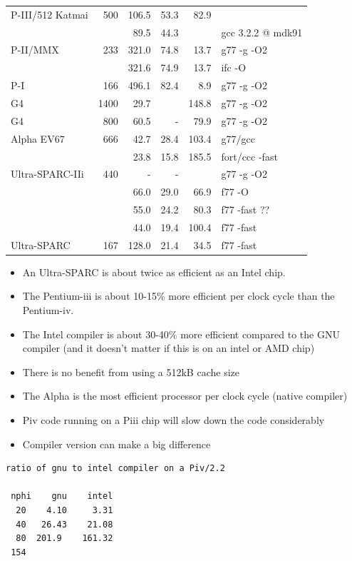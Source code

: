 \documentclass[10pt,dvips]{article}
\begin{document}
\begin{table}[htbp]
\begin{tabular}{|l|r|r|r|r|l|}
P-III/512 Katmai & 500  &	106.5 & 53.3  &  82.9 & \\  %
                &       &        89.5 & 44.3  &       & gcc 3.2.2 @ mdk91 \\
P-II/MMX        & 233   &       321.0 & 74.8  &  13.7 & g77 -g -O2 \\ %
		&	&	321.6 & 74.9  &  13.7 & ifc -O \\
P-I             & 166   &       496.1 & 82.4  &   8.9 & g77 -g -O2 \\ %
\hline
G4              & 1400  &        29.7 &       & 148.8 & g77 -g -O2\\ %
G4              &  800  &        60.5 & -     &  79.9 & g77 -g -O2 \\ %
\hline
Alpha EV67	& 666   &        42.7 & 28.4  & 103.4 & g77/gcc \\ %
		&       &        23.8 & 15.8  & 185.5 & fort/ccc -fast \\
Ultra-SPARC-IIi &  440  &	   -  &   -   &       & g77 -g -O2\\   %
		&  	&	 66.0 & 29.0  &  66.9 & f77 -O \\
		&  	&	 55.0 & 24.2  &  80.3 & f77 -fast  ?? \\
		&	&	 44.0 & 19.4  & 100.4 & f77 -fast \\
Ultra-SPARC     &  167  &       128.0 & 21.4  &  34.5 & f77 -fast \\
 \hline
\end{tabular}
\end{table}

\begin{itemize}
\item An Ultra-SPARC is about twice as efficient as an Intel chip.

\item The Pentium-iii is about 10-15\% more efficient per clock cycle
than the Pentium-iv.

\item The Intel compiler is about 30-40\% more efficient compared
to the GNU compiler (and it doesn't matter if this is on an intel or AMD chip)

\item There is no benefit from using a 512kB cache size 

\item The Alpha is the most efficient processor per clock cycle (native compiler)

\item Piv code running on a Piii chip will slow down the code considerably

\item Compiler version can make a big difference

\end{itemize}

\begin{verbatim}
ratio of gnu to intel compiler on a Piv/2.2

 nphi    gnu    intel
  20    4.10     3.31
  40   26.43    21.08
  80  201.9    161.32
 154

\end{verbatim}
\end{document}
